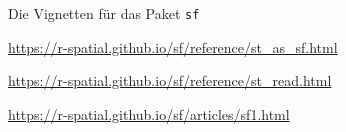 \documentclass[ignorenonframetext,]{beamer}
\begin{document}
\begin{frame}{Die Vignetten für das Paket \texttt{sf}}
\protect\hypertarget{die-vignetten-fur-das-paket-sf}{}

\url{https://r-spatial.github.io/sf/reference/st_as_sf.html}

\url{https://r-spatial.github.io/sf/reference/st_read.html}

\url{https://r-spatial.github.io/sf/articles/sf1.html}

\end{frame}
\end{document}
